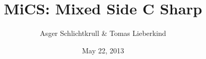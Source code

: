 \documentclass[12pt]{report}   						%
\begin{document}
\title{MiCS: Mixed Side C Sharp}
\author{Asger Schlichtkrull \& Tomas Lieberkind}
\date{May 22, 2013}
\maketitle



\tableofcontents














\end{document}
